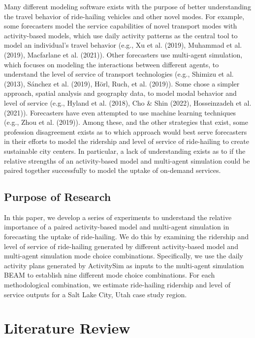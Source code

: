 \documentclass[fancy, masters]{byuthesis}
\begin{document}
Many different modeling software exists with the purpose of better understanding the travel behavior of ride-hailing vehicles and other novel modes. For example, some forecasters model the service capabilities of novel transport modes with activity-based models, which use daily activity patterns as the central tool to model an individual's travel behavior (e.g., Xu et al. (2019), Muhammad et al. (2019), Macfarlane et al. (2021)). Other forecasters use multi-agent simulation, which focuses on modeling the interactions between different agents, to understand the level of service of transport technologies (e.g., Shimizu et al. (2013), Sánchez et al. (2019), Hörl, Ruch, et al. (2019)). Some chose a simpler approach, spatial analysis and geography data, to model modal behavior and level of service (e.g., Hyland et al. (2018), Cho \& Shin (2022), Hosseinzadeh et al. (2021)). Forecasters have even attempted to use machine learning techniques (e.g., Zhou et al. (2019)). Among these, and the other strategies that exist, some profession disagreement exists as to which approach would best serve forecasters in their efforts to model the ridership and level of service of ride-hailing to create sustainable city centers. In particular, a lack of understanding exists as to if the relative strengths of an activity-based model and multi-agent simulation could be paired together successfully to model the uptake of on-demand services.

\hypertarget{purpose-of-research}{%
\section{Purpose of Research}\label{purpose-of-research}}

In this paper, we develop a series of experiments to understand the relative importance of a paired activity-based model and multi-agent simulation in forecasting the uptake of ride-hailing. We do this by examining the ridership and level of service of ride-hailing generated by different activity-based model and multi-agent simulation mode choice combinations. Specifically, we use the daily activity plans generated by ActivitySim as inputs to the multi-agent simulation BEAM to establish nine different mode choice combinations. For each methodological combination, we estimate ride-hailing ridership and level of service outputs for a Salt Lake City, Utah case study region.

\hypertarget{lit}{%
\chapter{Literature Review}\label{lit}}
\end{document}
